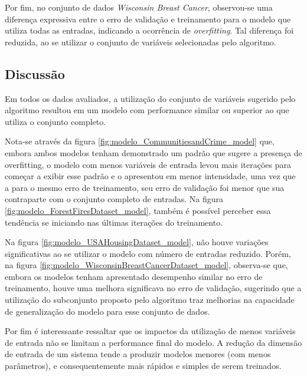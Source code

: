 Por fim, no conjunto de dados \textit{Wisconsin Breast Cancer}, observou-se uma diferença expressiva entre o erro de validação e treinamento para o modelo que utiliza todas as entradas, indicando a ocorrência de \textit{overfitting}. Tal diferença foi reduzida, ao se utilizar o conjunto de variáveis selecionadas pelo algoritmo.

\FloatBarrier
\subsection{Discussão}

Em todos os dados avaliados, a utilização do conjunto de variáveis sugerido pelo algoritmo resultou em um modelo com performance similar ou superior ao que utiliza o conjunto completo.

Nota-se através da figura \ref{fig:modelo_CommunitiesandCrime_model} que, embora ambos modelos tenham demonstrado um padrão que sugere a presença de overfitting, o modelo com menos variáveis de entrada levou mais iterações para começar a exibir esse padrão e o apresentou em menor intensidade, uma vez que a para o mesmo erro de treinamento, seu erro de validação foi menor que sua contraparte com o conjunto completo de entradas. Na figura \ref{fig:modelo_ForestFiresDataset_model}, também é possível perceber essa tendência se iniciando nas últimas iterações do treinamento.

Na figura \ref{fig:modelo_USAHousingDataset_model}, não houve variações significativas ao se utilizar o modelo com número de entradas reduzido. Porém, na figura \ref{fig:modelo_WisconsinBreastCancerDataset_model}, observa-se que, embora os modelos tenham apresentado desempenho similar no erro de treinamento, houve uma melhora significava no erro de validação, sugerindo que a utilização do subconjunto proposto pelo algoritmo traz melhorias na capacidade de generalização do modelo para esse conjunto de dados.

Por fim é interessante ressaltar que os impactos da utilização de menos variáveis de entrada não se limitam a performance final do modelo. A redução da dimensão de entrada de um sistema tende a produzir modelos menores (com menos parâmetros), e consequentemente mais rápidos e simples de serem treinados.